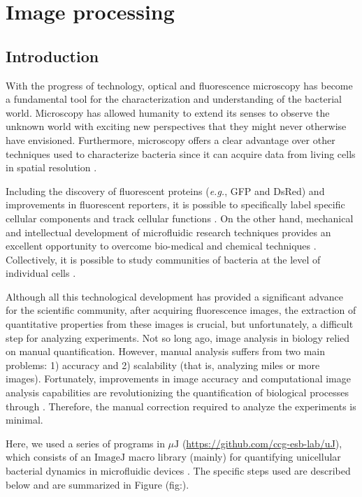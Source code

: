 \documentclass[
  12pt,
  a4paper,
  oneside]{krantz}
\begin{document}
\hypertarget{image-processing}{%
\chapter{Image processing}\label{image-processing}}

\hypertarget{introduction-1}{%
\section{Introduction}\label{introduction-1}}

With the progress of technology, optical and fluorescence microscopy has
become a fundamental tool for the characterization and understanding of
the bacterial world. Microscopy has allowed humanity to extend its
senses to observe the unknown world with exciting new perspectives that
they might never otherwise have envisioned. Furthermore, microscopy
offers a clear advantage over other techniques used to characterize
bacteria since it can acquire data from living cells in spatial
resolution \citep{schermelleh2019}.

Including the discovery of fluorescent proteins (\emph{e.g.}, GFP and DsRed)
and improvements in fluorescent reporters, it is possible to
specifically label specific cellular components and track cellular
functions \citep{Specht2017}. On the other hand, mechanical and intellectual
development of microfluidic research techniques provides an excellent
opportunity to overcome bio-medical and chemical techniques
\citep{convery2019}. Collectively, it is possible to study communities of
bacteria at the level of individual cells \citep{balaban2004a, elowitz2002}.

Although all this technological development has provided a significant
advance for the scientific community, after acquiring fluorescence
images, the extraction of quantitative properties from these images is
crucial, but unfortunately, a difficult step for analyzing experiments.
Not so long ago, image analysis in biology relied on manual
quantification. However, manual analysis suffers from two main problems:
1) accuracy and 2) scalability (that is, analyzing miles or more
images). Fortunately, improvements in image accuracy and computational
image analysis capabilities are revolutionizing the quantification of
biological processes through \citep{Caicedo2017, Smith2018}. Therefore, the
manual correction required to analyze the experiments is minimal.

Here, we used a series of programs in \(\mu \mathrm{J}\)
(\url{https://github.com/ccg-esb-lab/uJ}), which consists of an
\(\mathrm{ImageJ}\) macro library (mainly) for quantifying unicellular
bacterial dynamics in microfluidic devices \citep{schneider2012}. The
specific steps used are described below and are summarized in Figure
\citet{ref}(fig:).
\end{document}
